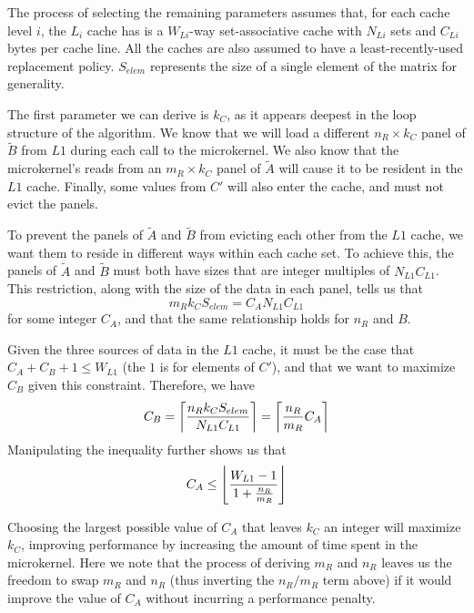 \documentclass[12pt]{article}
\DeclarePairedDelimiter\ceil{\lceil}{\rceil}
\DeclarePairedDelimiter\floor{\lfloor}{\rfloor}
\begin{document}
The process of selecting the remaining parameters assumes that, for each cache level $i$, the $L_i$ cache has is a $W_{Li}$-way set-associative cache with $N_{Li}$ sets and $C_{Li}$ bytes per cache line.
All the caches are also assumed to have a least-recently-used replacement policy.
$S_{elem}$ represents the size of a single element of the matrix for generality.

The first parameter we can derive is $k_C$, as it appears deepest in the loop structure of the algorithm.
We know that we will load a different $n_R \times k_C$ panel of $\widetilde{B}$ from $L1$ during each call to the microkernel.
We also know that the microkernel's reads from an $m_R \times k_C$ panel of $\widetilde{A}$ will cause it to be resident in the $L1$ cache.
Finally, some values from $C'$ will also enter the cache, and must not evict the panels.

To prevent the panels of $\widetilde{A}$ and $\widetilde{B}$ from evicting each other from the $L1$ cache, we want them to reside in different ways within each cache set.
To achieve this, the panels of $\widetilde{A}$ and $\widetilde{B}$ must both have sizes that are integer multiples of $N_{L1}C_{L1}$.
This restriction, along with the size of the data in each panel, tells us that
\begin{equation*}
  m_Rk_CS_{elem} = C_AN_{L1}C_{L1}
\end{equation*}
for some integer $C_A$, and that the same relationship holds for $n_R$ and $B$.

Given the three sources of data in the $L1$ cache, it must be the case that $C_A + C_B + 1 \leq W_{L1}$ (the $1$ is for elements of $C'$), and that we want to maximize $C_B$ given this constraint.
Therefore, we have
\begin{equation*}
  C_B = \ceil*{\frac{n_Rk_CS_{elem}}{N_{L1}C_{L1}}} = \ceil*{\frac{n_R}{m_R}C_A}
\end{equation*}
Manipulating the inequality further shows us that
\begin{equation*}
  C_A \leq \floor*{\frac{W_{L1} - 1}{1 + \frac{n_R}{m_R}}}
\end{equation*}

Choosing the largest possible value of $C_A$ that leaves $k_C$ an integer will maximize $k_C$, improving performance by increasing the amount of time spent in the microkernel.
Here we note that the process of deriving $m_R$ and $n_R$ leaves us the freedom to swap $m_R$ and $n_R$ (thus inverting the $n_R/m_R$ term above) if it would improve the value of $C_A$ without incurring a performance penalty.
\end{document}

